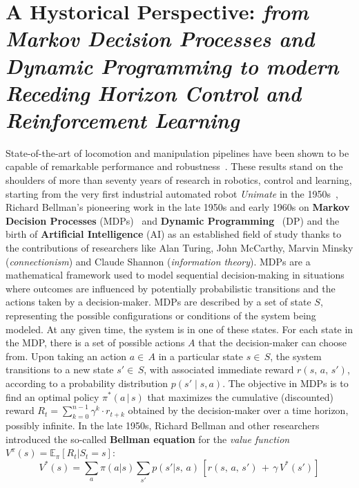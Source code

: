 \section{A Hystorical Perspective: \textnormal{\textit{from Markov Decision Processes and Dynamic Programming to modern Receding Horizon Control and Reinforcement Learning}}}
State-of-the-art of locomotion and manipulation pipelines have been shown to be capable of remarkable performance and robustness~\cite{rl:schneider2023learning,rl:miki2024learning,web::atlas_grip_boston_dyn,web::lrhc_boston_dyn}. These results stand on the shoulders of more than seventy years of research in robotics, control and learning, starting from the very first industrial automated robot \textit{Unimate} in the 1950s~\cite{origins:xu2018fourth}, Richard Bellman's pioneering work in the late 1950s and early 1960s on \textbf{Markov Decision Processes} (MDPs)~\cite{rl:bellman1957markovian} and \textbf{Dynamic Programming}~\cite{rl:bellman1960dynamic} (DP) and the birth of \textbf{Artificial Intelligence} (AI) as an established field of study thanks to the contributions of researchers like Alan Turing, John McCarthy, Marvin Minsky (\textit{connectionism}) and Claude Shannon (\textit{information theory}).
MDPs are a mathematical framework used to model sequential decision-making in situations where outcomes are influenced by potentially probabilistic transitions and the actions taken by a decision-maker. MDPs are described by a set of state $S$, representing the possible configurations or conditions of the system being modeled. At any given time, the system is in one of these states. For each state in the MDP, there is a set of possible actions $A$ that the decision-maker can choose from. Upon taking an action $a\in\,A$ in a particular state $s\in\,S$, the system transitions to a new state $s'\in\,S$, with associated immediate reward $r(s,\,a,\,s')$, according to a probability distribution $p(s'\mid s, a)$. The objective in MDPs is to find an optimal policy $\pi^{*}(a\,\vert\,s)$ that maximizes the cumulative (discounted) reward $R_t = \sum_{k=0}^{n-1} \gamma^k \cdot r_{t+k}$ obtained by the decision-maker over a time horizon, possibly infinite.
In the late 1950s, Richard Bellman and other researchers introduced the so-called \textbf{Bellman equation} for the \textit{value function} $V^{\pi}(s) = \mathbb{E}_\pi [R_t|S_t=s]$:
\begin{equation}\label{eq:bellman}
	V^{*}(s) = \sum_{a} \pi(a|s) \sum_{s'} p(s'|s,\,a) \,[r(s,\,a,\,s')\,+\,\gamma\,V^{*}(s')]
\end{equation}
